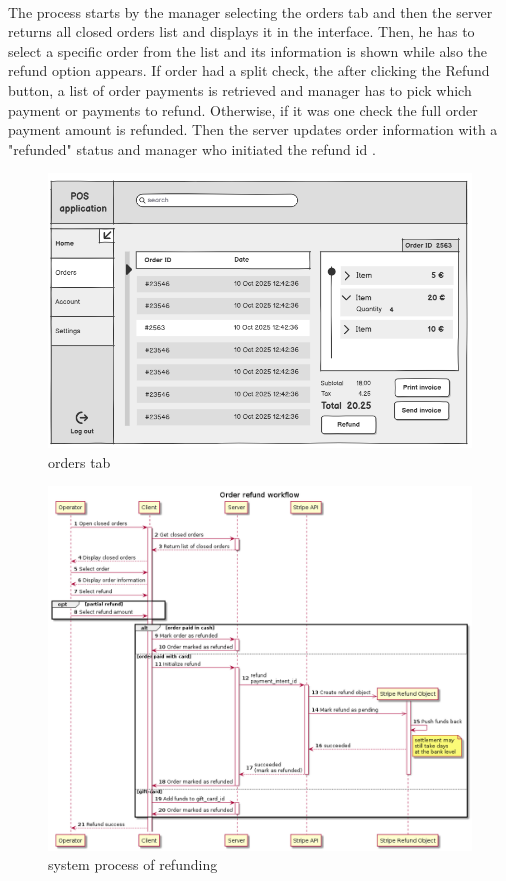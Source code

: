 \documentclass{article}
\begin{document}
    \paragraph{}The process starts by the manager selecting the orders tab and then the server returns all closed orders list and displays it in the interface. Then, he has to select a specific order from the list and its information is shown while also the refund option appears. If order had a split check, the after clicking the Refund button, a list of order payments is retrieved and manager has to pick which payment or payments to refund. Otherwise, if it was one check the full order payment amount is refunded. Then the server updates order information with a "refunded" status and manager who initiated the refund id . 
    \begin{figure}[H]
        \centering
        \includegraphics[width=0.9\linewidth]{PSP/lab-1/mockups/orders.png}
        \caption{orders tab}
        \label{}
    \end{figure}
    
    \begin{figure}[H]
        \centering
        \includegraphics[width=0.9\linewidth]{PSP/lab-1/diagrams/sequence/refund.png}
        \caption{system process of refunding}
        \label{}
    \end{figure}
\end{document}
